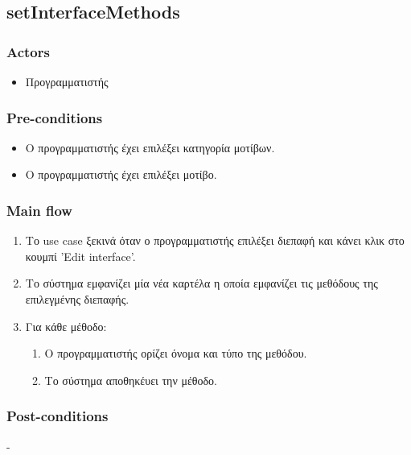 \documentclass[../diploma_thesis.tex]{subfiles}
\begin{document}
\subsection{setInterfaceMethods}
\subsubsection{Actors}
\begin{itemize}
\item  Προγραμματιστής
\end{itemize}
\subsubsection{Pre-conditions}
\begin{itemize}
\item Ο προγραμματιστής έχει επιλέξει κατηγορία μοτίβων.
\item  Ο προγραμματιστής έχει επιλέξει μοτίβο.
\end{itemize}
\subsubsection{Main flow}
\begin{enumerate}
\item Το use case ξεκινά όταν ο προγραμματιστής επιλέξει διεπαφή και κάνει κλικ στο κουμπί 'Edit interface'.
\item Το σύστημα εμφανίζει μία νέα καρτέλα η οποία εμφανίζει τις μεθόδους της επιλεγμένης διεπαφής.
\item Για κάθε μέθοδο:\begin{enumerate}
\item Ο προγραμματιστής ορίζει όνομα και τύπο της μεθόδου.
\item Το σύστημα αποθηκέυει την μέθοδο.
\end{enumerate}
\end{enumerate}
\subsubsection{Post-conditions}
-
\end{document}
